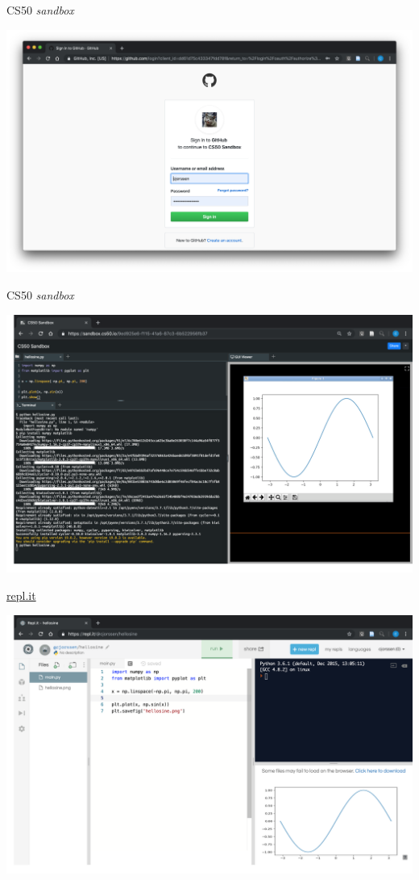 \documentclass[10pt,aspectratio=169]{beamer}
\begin{document}
\begin{frame}{CS50 \emph{sandbox}}
  \begin{center}
    \includegraphics[height = .8\textheight]{cs50-github}
  \end{center}
\end{frame}

\begin{frame}{CS50 \emph{sandbox}}
  \begin{center}
    \includegraphics[height = .8\textheight]{cs50-hellosine}
  \end{center}
\end{frame}

\begin{frame}{\url{repl.it}}
  \begin{center}
    \includegraphics[height = .8\textheight]{replit-hellosine}
  \end{center}
\end{frame}
\end{document}
